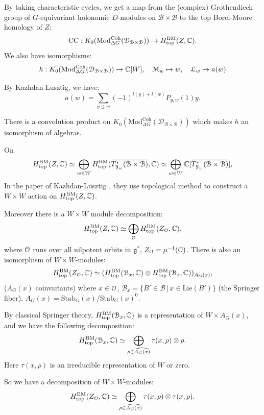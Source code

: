\documentclass[12pt]{amsart}
\numberwithin{equation}{section}
\newcommand{\fg}{\mathfrak{g}} \newcommand{\fh}{\mathfrak{h}} \newcommand{\fk}{\mathfrak{k}}
\renewcommand{\bar}{\overline}
\newcommand{\set}[2]{\{#1\,|\,#2\}}
\begin{document}
By taking characteristic cycles, we get a map from the (complex) Grothendieck group of $G$-equivariant holonomic $D$-modules on $\mathcal{B} \times \mathcal{B}$ to the top Borel-Moore homology of $Z$:
\[\mathrm{CC} : K_0(\mathrm{Mod}^{\mathrm{Coh}}_{\Delta G}(\mathcal{D}_{\mathcal{B} \times \mathcal{B}})) \to H_{\mathrm{top}}^{\mathrm{BM}}(Z,{\mathbb {C}}).\]
We also have isomorphisms:
\[ 
  h: K_0(\mathrm{Mod}^{\mathrm{Coh}}_{\Delta G}(\mathcal{D}_{\mathcal{B} \times \mathcal{B}})) \to {\mathbb {C}}[W], \quad {\mathcal {M}}_w \mapsto w, \quad {\mathcal {L}}_w \mapsto a(w)
\]

By Kazhdan-Lusztig, we have: 
\[
  a(w) = \sum_{y \leq w} (-1)^{l(y)+l(w)}P_{y,w}(1) y.
\]

There is a convolution product on $K_0(\mathrm{Mod}^{\mathrm{Coh}}_{\Delta G}(\mathcal{D}_{\mathcal{B} \times \mathcal{B}}))$ which makes $h$ an isomorphism of algebras.

On $$H_{\mathrm{top}}^{\mathrm{BM}}(Z,\BC) \simeq \bigoplus_{w \in W} H_{\mathrm{top}}^{\mathrm{BM}}(\bar{T^*_{\mathcal{Y}_w}(\mathcal{B} \times \mathcal{B})},\BC) \simeq \bigoplus_{w \in W} \BC[\bar{T^*_{\mathcal{Y}_w}(\mathcal{B} \times \mathcal{B})}],$$
In the paper of Kazhdan-Lusztig \cite{KL80}, they use topological method to construct a $W \times W$ action on $H_{\mathrm{top}}^{\mathrm{BM}}(Z,{\mathbb {C}})$.

Moreover there is a $W \times W$ module decomposition:
\[H_{\mathrm{top}}^{\mathrm{BM}}(Z,{\mathbb {C}}) \simeq \bigoplus_{{\mathcal {O}}} H^{\mathrm{BM}}_{\mathrm{top}}(Z_{{\mathcal {O}}},{\mathbb {C}}),\]
where ${\mathcal {O}}$ runs over all nilpotent orbits in $\fg^*$, $Z_{{\mathcal {O}}} = \mu^{-1}({\mathcal {O}})$.
There is also an isomorphism of $W \times W$-modules:
\[
H^{\mathrm{BM}}_{\mathrm{top}}(Z_{{\mathcal {O}}},{\mathbb {C}}) \simeq (H^{\mathrm{BM}}_{\mathrm{top}}(\mathcal{B}_x,{\mathbb {C}}) \otimes H^{\mathrm{BM}}_{\mathrm{top}}(\mathcal{B}_x,{\mathbb {C}}))_{A_G(x)},\]
($A_G(x)$ coinvariants) where $x \in {\mathcal {O}}$, $\mathcal{B}_x = \set{B' \in \mathcal{B}}{x \in \mathrm{Lie}(B')}$ (the Springer fiber), $A_G(x) = \mathrm{Stab}_G(x)/\mathrm{Stab}_G(x)^0$.

By classical Springer theory, $H^{\mathrm{BM}}_{\mathrm{top}}(\mathcal{B}_x,{\mathbb {C}})$ is a representation of $W \times A_G(x)$, and we have the following decomposition:
\[H^{\mathrm{BM}}_{\mathrm{top}}(\mathcal{B}_x,{\mathbb {C}}) \simeq \bigoplus_{\rho \in \widehat{A_G(x)}} \tau(x,\rho) \otimes \rho.\]
Here $\tau(x,\rho)$ is an irreducible representation of $W$ or zero.

So we have a decomposition of $W \times W$-modules:
\[H^{\mathrm{BM}}_{\mathrm{top}}(Z_{{\mathcal {O}}},{\mathbb {C}}) \simeq \bigoplus_{\rho \in \widehat{A_G(x)}} \tau(x,\rho) \otimes \tau(x,\rho).\]
\end{document}
